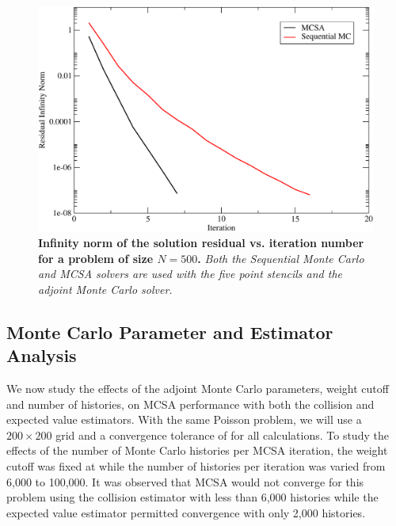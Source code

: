 \begin{figure}[t!]
  \centering
  \includegraphics[width=4.5in,clip]{chapters/mc_background/seq_conv_500.pdf}
  \caption{\textbf{Infinity norm of the solution residual
      vs. iteration number for a problem of size $N=500$.}
    \textit{Both the Sequential Monte Carlo and MCSA solvers are used
      with the five point stencils and the adjoint Monte Carlo
      solver.}}
  \label{fig:seq_500}
\end{figure}

\clearpage

\subsection{Monte Carlo Parameter and Estimator Analysis}
\label{sec:parameter_estimator_analysis}
We now study the effects of the adjoint Monte Carlo parameters, weight
cutoff and number of histories, on MCSA performance with both the
collision and expected value estimators. With the same Poisson
problem, we will use a $200 \times 200$ grid and a convergence
tolerance of  for all calculations. To study the effects of
the number of Monte Carlo histories per MCSA iteration, the weight
cutoff was fixed at  while the number of histories per
iteration was varied from 6,000 to 100,000. It was observed that MCSA
would not converge for this problem using the collision estimator with
less than 6,000 histories while the expected value estimator permitted
convergence with only 2,000 histories.

